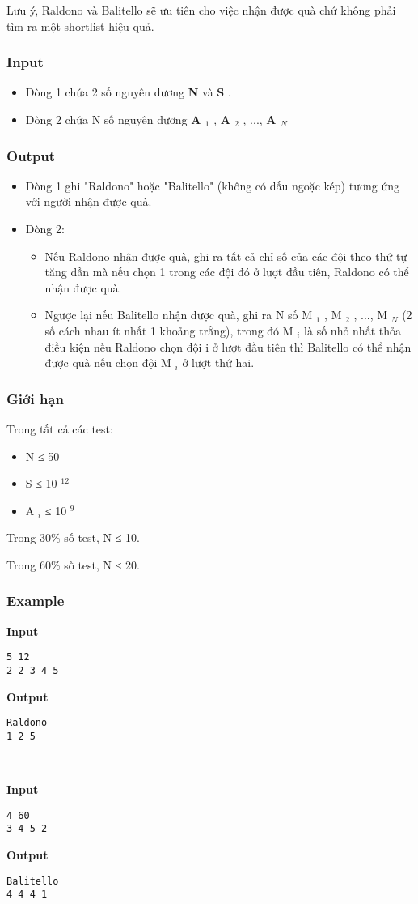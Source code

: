 Lưu ý, Raldono và Balitello sẽ ưu tiên cho việc nhận được quà chứ không phải tìm ra một shortlist hiệu quả.

\subsubsection{Input}
\begin{itemize}
	\item Dòng 1 chứa 2 số nguyên dương \textbf{ N } và \textbf{ S } .
	\item Dòng 2 chứa N số nguyên dương \textbf{ A $_ 1 $} , \textbf{ A $_ 2 $} , ..., \textbf{ A $_ N $}
\end{itemize}

\subsubsection{Output}
\begin{itemize}
	\item Dòng 1 ghi "Raldono" hoặc "Balitello" (không có dấu ngoặc kép) tương ứng với người nhận được quà.
	\item Dòng 2:
\begin{itemize}
	\item Nếu Raldono nhận được quà, ghi ra tất cả chỉ số của các đội theo thứ tự tăng dần mà nếu chọn 1 trong các đội đó ở lượt đầu tiên, Raldono có thể nhận được quà.
	\item Ngược lại nếu Balitello nhận được quà, ghi ra N số M $_ 1 $ , M $_ 2 $ , ..., M $_ N $ (2 số cách nhau ít nhất 1 khoảng trắng), trong đó M $_ i $ là số nhỏ nhất thỏa điều kiện nếu Raldono chọn đội i ở lượt đầu tiên thì Balitello có thể nhận được quà nếu chọn đội M $_ i $ ở lượt thứ hai.
\end{itemize}
\end{itemize}

\subsubsection{Giới hạn}

Trong tất cả các test:
\begin{itemize}
	\item N ≤ 50
	\item S ≤ 10 $^ 12 $
	\item A $_ i $ ≤ 10 $^ 9 $
\end{itemize}

Trong 30\% số test, N ≤ 10.

Trong 60\% số test, N ≤ 20.

\subsubsection{Example}

\textbf{Input }
\begin{verbatim}
5 12
2 2 3 4 5\end{verbatim}

\textbf{Output }
\begin{verbatim}
Raldono
1 2 5\end{verbatim}

 

\textbf{Input }
\begin{verbatim}
4 60
3 4 5 2\end{verbatim}

\textbf{Output }
\begin{verbatim}
Balitello
4 4 4 1\end{verbatim}